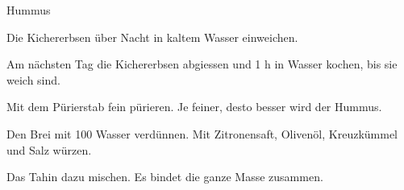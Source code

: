 
\begin{recipe}[]{Hummus}{}{}



\step
Die Kichererbsen \"uber Nacht in kaltem Wasser einweichen.

\step
Am n\"achsten Tag die Kichererbsen abgiessen und 1 h in Wasser kochen, bis sie weich sind.

\step
Mit dem P\"urierstab fein p\"urieren. Je feiner, desto besser wird der Hummus.

\step
Den Brei mit 100 \ml Wasser verd\"unnen. Mit Zitronensaft, Oliven\"ol, Kreuzk\"ummel und Salz w\"urzen.

\step
Das Tahin dazu mischen. Es bindet die ganze Masse zusammen.

\end{recipe}